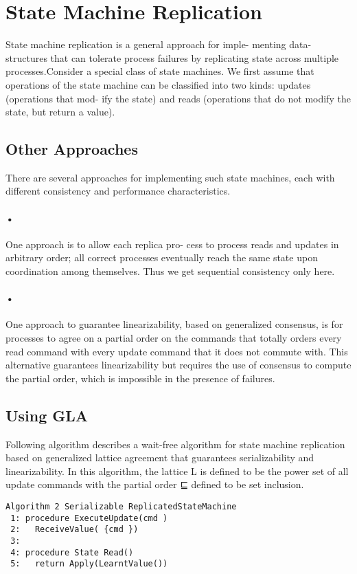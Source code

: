 \documentclass[a4paper,12pt]{report}
\begin{document}
\section{State Machine Replication}
State machine replication is a general approach for imple-
menting data-structures that can tolerate process failures by
replicating state across multiple processes.Consider a special class of state machines.
We first assume that operations of the state machine can
be classified into two kinds: updates (operations that mod-
ify the state) and reads (operations that do not modify the
state, but return a value).
\subsection*{Other Approaches}
There are several approaches for implementing such state
machines, each with different consistency and performance
characteristics. 
\paragraph*{•}
One approach is to allow each replica pro-
cess to process reads and updates in arbitrary order;  all correct processes eventually reach the same state upon coordination among themselves. Thus we get sequential consistency only here.
\paragraph*{•}
One approach to guarantee linearizability, based on 
generalized consensus, is for processes to agree on a partial order
on the commands that totally orders every read command
with every update command that it does not commute with.
This alternative guarantees linearizability but requires the
use of consensus to compute the partial order, which is 
impossible in the presence of failures.

\subsection*{Using GLA}
Following algorithm describes a wait-free algorithm for state machine replication
based on generalized lattice agreement that guarantees serializability and linearizability. 
In this algorithm, the lattice L is defined to be
the power set of all update commands with the partial
 order ⊑ defined to be set inclusion. 
 \begin{verbatim}
Algorithm 2 Serializable ReplicatedStateMachine 
 1: procedure ExecuteUpdate(cmd )
 2:   ReceiveValue( {cmd })
 3:
 4: procedure State Read()
 5:   return Apply(LearntValue())
 \end{verbatim}
 
\end{document}
